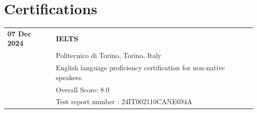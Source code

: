 \documentclass[
	11pt, %
]{resume} %
\begin{document}

\section*{Certifications}
\begin{longtable}{@{} p{3.5cm} p{11.5cm} @{}}

\textbf{07 Dec 2024} & \textbf{IELTS} \\
    & Politecnico di Torino, Torino, Italy \\
    & \textbullet{} English language proficiency certification for non-native speakers. \\
    & \textbullet{} Overall Score: 8.0 \\
    & \textbullet{} Test report number : 24IT002110CANE694A

\end{longtable}

\end{document}

